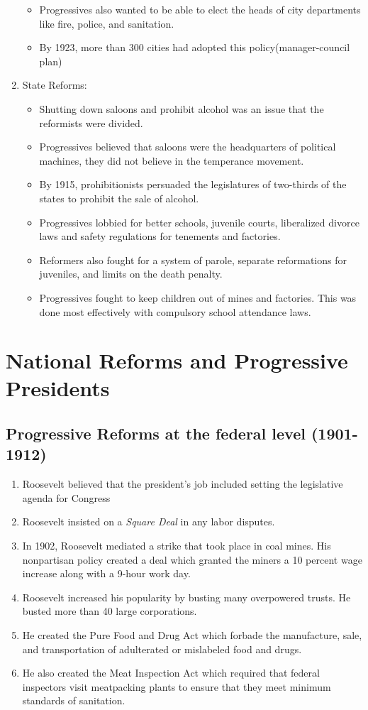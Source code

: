 \documentclass[12pt]{article} %
\begin{document}
\begin{enumerate}
\begin{itemize}
		\item Progressives also wanted to be able to elect the heads of city departments like fire,
			police, and sanitation.
		\item By 1923, more than 300 cities had adopted this policy(manager-council plan)
	\end{itemize}
	\item State Reforms:
	\begin{itemize}
		\item Shutting down saloons and prohibit alcohol was an issue that the reformists were 
			divided.
		\item Progressives believed that saloons were the headquarters of political machines, they
			did not believe in the temperance movement.
		\item By 1915, prohibitionists persuaded the legislatures of two-thirds of the states to 
			prohibit the sale of alcohol.
		\item Progressives lobbied for better schools, juvenile courts, liberalized divorce laws and
			safety regulations for tenements and factories.
		\item Reformers also fought for a system of parole, separate reformations for juveniles, and
			limits on the death penalty.
		\item Progressives fought to keep children out of mines and factories. This was done most 
			effectively with compulsory school attendance laws. 
	\end{itemize}
\end{enumerate}

\section{National Reforms and Progressive Presidents}
\subsection{Progressive Reforms at the federal level (1901-1912)}
\begin{enumerate}
	\item Roosevelt believed that the president's job included setting the legislative agenda for
		Congress
	\item Roosevelt insisted on a \textit{Square Deal} in any labor disputes.
	\item In 1902, Roosevelt mediated a strike that took place in coal mines. His nonpartisan policy
		created a deal which granted the miners a 10 percent wage increase along with a 9-hour work
		day.
	\item Roosevelt increased his popularity by busting many overpowered trusts. He busted more than
		40 large corporations.
	\item He created the Pure Food and Drug Act which forbade the manufacture, sale, and 
		transportation of adulterated or mislabeled food and drugs.
	\item He also created the Meat Inspection Act which required that federal inspectors visit
		meatpacking plants to ensure that they meet minimum standards of sanitation.
\end{enumerate}
\end{document}
